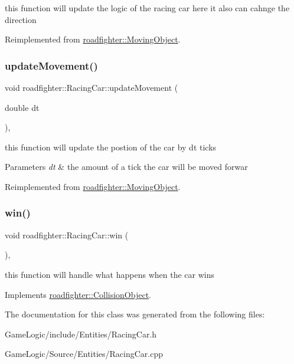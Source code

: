 this function will update the logic of the racing car here it also can cahnge the direction 

Reimplemented from \hyperlink{classroadfighter_1_1MovingObject_a2c5d69054a59fc5c6d7458f864ee9d57}{roadfighter\+::\+Moving\+Object}.

\mbox{\label{classroadfighter_1_1RacingCar_a2e8f3c63381a1fe432cddcc1f34fb935}} 
\subsubsection{\texorpdfstring{update\+Movement()}{updateMovement()}}
{\footnotesize\ttfamily void roadfighter\+::\+Racing\+Car\+::update\+Movement (\begin{DoxyParamCaption}\item[{double}]{dt }\end{DoxyParamCaption})\hspace{0.3cm}{\ttfamily [override]}, {\ttfamily [virtual]}}

this function will update the postion of the car by dt ticks 
\begin{DoxyParams}{Parameters}
{\em dt} & the amount of a tick the car will be moved forwar \\
\hline
\end{DoxyParams}


Reimplemented from \hyperlink{classroadfighter_1_1MovingObject_ac1918d96dac118c4bd7d99168d92867c}{roadfighter\+::\+Moving\+Object}.

\mbox{\label{classroadfighter_1_1RacingCar_a24293ac56920da01d29fe99aee8d3ea6}} 
\subsubsection{\texorpdfstring{win()}{win()}}
{\footnotesize\ttfamily void roadfighter\+::\+Racing\+Car\+::win (\begin{DoxyParamCaption}{ }\end{DoxyParamCaption})\hspace{0.3cm}{\ttfamily [override]}, {\ttfamily [virtual]}}

this function will handle what happens when the car wins 

Implements \hyperlink{classroadfighter_1_1CollisionObject_a03ce1ae52676088839d85c597743052c}{roadfighter\+::\+Collision\+Object}.



The documentation for this class was generated from the following files\+:\begin{DoxyCompactItemize}
\item 
Game\+Logic/include/\+Entities/Racing\+Car.\+h\item 
Game\+Logic/\+Source/\+Entities/Racing\+Car.\+cpp\end{DoxyCompactItemize}
